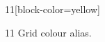 \documentclass[paper=A4]{ropas-poster}
\begin{document}
\begin{postergrid}{1}{1}[block-color=yellow]
\begin{posterblock}{1}{1}
Grid colour alias.
\end{posterblock}
\end{postergrid}
\end{document}
